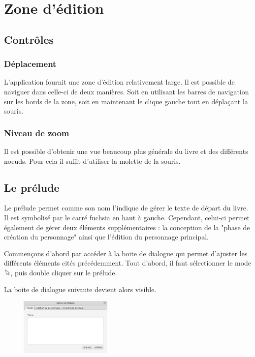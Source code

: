 \chapter{Zone d'édition}

	\section{Contrôles}

		\subsection{Déplacement}

			L'application fournit une zone d'édition relativement large. Il est possible de naviguer dans celle-ci de deux manières. Soit en utilisant les barres de navigation sur les bords de la zone, soit en maintenant le clique gauche tout en déplaçant la souris.

		\subsection{Niveau de zoom}

			Il est possible d'obtenir une vue beaucoup plus générale du livre et des différents noeuds. Pour cela il suffit d'utiliser la molette de la souris.

	\section{Le prélude}

        Le prélude permet comme son nom l'indique de gérer le texte de départ du livre. Il est symbolisé par le carré fuchsia en haut à gauche. Cependant, celui-ci permet également de gérer deux éléments supplémentaires : la conception de la "phase de création du personnage" ainsi que l'édition du personnage principal.

		Commençons d'abord par accéder à la boite de dialogue qui permet d'ajuster les différents éléments cités précédemment. Tout d'abord, il faut sélectionner le mode \includegraphics[height=10pt, keepaspectratio]{img/icons/select.png}, puis double cliquer sur le prélude.

		La boite de dialogue suivante devient alors visible.

		\begin{figure}[H]
			\centering\includegraphics[width=0.4\textwidth, keepaspectratio]{img/prelude.png}
		\end{figure}

